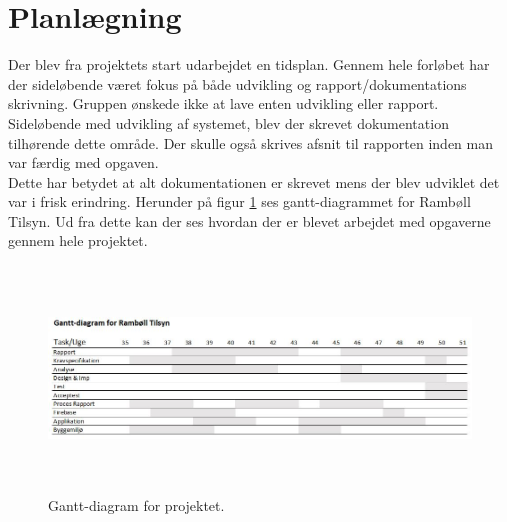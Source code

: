 \section{Planlægning}
Der blev fra projektets start udarbejdet en tidsplan.
Gennem hele forløbet har der sideløbende været fokus på både udvikling og rapport/dokumentations skrivning.
Gruppen ønskede ikke at lave enten udvikling eller rapport. Sideløbende med udvikling af systemet, blev der skrevet dokumentation tilhørende dette område. Der skulle også skrives afsnit til rapporten inden man var færdig med opgaven. \\
Dette har betydet at alt dokumentationen er skrevet mens der blev udviklet det var i frisk erindring.
Herunder på figur \ref{fig:Tidsplan} ses gantt-diagrammet for Rambøll Tilsyn. Ud fra dette kan der ses hvordan der er blevet arbejdet med opgaverne gennem hele projektet.

\begin{figure} [H]
	\begin{center}
		\includegraphics[height=6cm, width=17cm]{Planlaegning/Tidsplan}
	\end{center}
	\caption{Gantt-diagram for projektet.}
	\label{fig:Tidsplan}
\end{figure}

\clearpage

